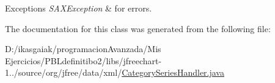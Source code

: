 \begin{DoxyExceptions}{Exceptions}
{\em S\+A\+X\+Exception} & for errors. \\
\hline
\end{DoxyExceptions}


The documentation for this class was generated from the following file\+:\begin{DoxyCompactItemize}
\item 
D\+:/ikasgaiak/programacion\+Avanzada/\+Mis Ejercicios/\+P\+B\+Ldefinitibo2/libs/jfreechart-\/1../source/org/jfree/data/xml/\mbox{\hyperlink{_category_series_handler_8java}{Category\+Series\+Handler.\+java}}\end{DoxyCompactItemize}
